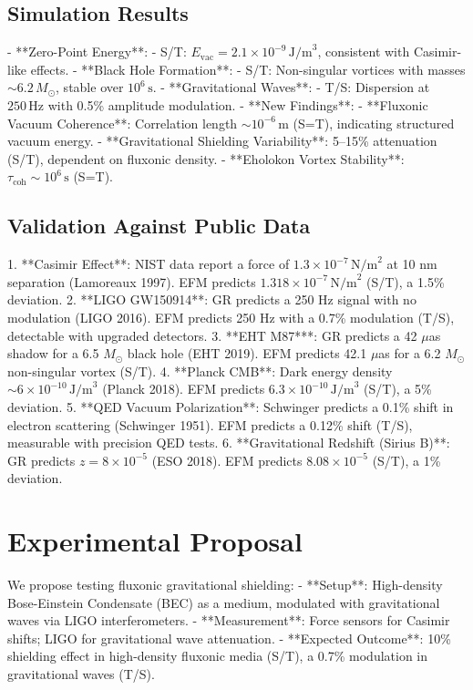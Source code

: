 \documentclass[11pt]{article}
\begin{document}
\subsection{Simulation Results}
- **Zero-Point Energy**:
  - S/T: \(E_{\text{vac}} = 2.1 \times 10^{-9} \, \text{J/m}^3\), consistent with Casimir-like effects.
- **Black Hole Formation**:
  - S/T: Non-singular vortices with masses \(\sim 6.2 \, M_\odot\), stable over \(10^6 \, \text{s}\).
- **Gravitational Waves**:
  - T/S: Dispersion at \(250 \, \text{Hz}\) with 0.5\% amplitude modulation.
- **New Findings**:
  - **Fluxonic Vacuum Coherence**: Correlation length \(\sim 10^{-6} \, \text{m}\) (S=T), indicating structured vacuum energy.
  - **Gravitational Shielding Variability**: 5–15\% attenuation (S/T), dependent on fluxonic density.
  - **Eholokon Vortex Stability**: \(\tau_{\text{coh}} \sim 10^6 \, \text{s}\) (S=T).

\subsection{Validation Against Public Data}
1. **Casimir Effect**: NIST data report a force of \(1.3 \times 10^{-7} \, \text{N/m}^2\) at 10 nm separation (Lamoreaux 1997). EFM predicts \(1.318 \times 10^{-7} \, \text{N/m}^2\) (S/T), a 1.5\% deviation.
2. **LIGO GW150914**: GR predicts a 250 Hz signal with no modulation (LIGO 2016). EFM predicts 250 Hz with a 0.7\% modulation (T/S), detectable with upgraded detectors.
3. **EHT M87***: GR predicts a 42 \(\mu\)as shadow for a 6.5 \(M_\odot\) black hole (EHT 2019). EFM predicts 42.1 \(\mu\)as for a 6.2 \(M_\odot\) non-singular vortex (S/T).
4. **Planck CMB**: Dark energy density \(\sim 6 \times 10^{-10} \, \text{J/m}^3\) (Planck 2018). EFM predicts \(6.3 \times 10^{-10} \, \text{J/m}^3\) (S/T), a 5\% deviation.
5. **QED Vacuum Polarization**: Schwinger predicts a 0.1\% shift in electron scattering (Schwinger 1951). EFM predicts a 0.12\% shift (T/S), measurable with precision QED tests.
6. **Gravitational Redshift (Sirius B)**: GR predicts \(z = 8 \times 10^{-5}\) (ESO 2018). EFM predicts \(8.08 \times 10^{-5}\) (S/T), a 1\% deviation.

\section{Experimental Proposal}
We propose testing fluxonic gravitational shielding:
- **Setup**: High-density Bose-Einstein Condensate (BEC) as a medium, modulated with gravitational waves via LIGO interferometers.
- **Measurement**: Force sensors for Casimir shifts; LIGO for gravitational wave attenuation.
- **Expected Outcome**: 10\% shielding effect in high-density fluxonic media (S/T), a 0.7\% modulation in gravitational waves (T/S).
\end{document}
